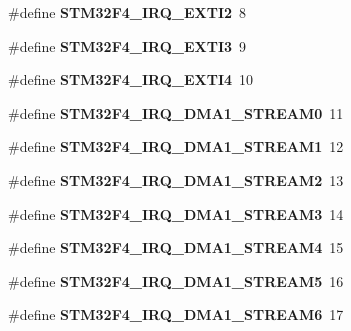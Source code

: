 \begin{DoxyCompactItemize}
\#define {\bfseries S\+T\+M32\+F4\+\_\+\+I\+R\+Q\+\_\+\+E\+X\+T\+I2}~8
\item 
\mbox{\label{group__stm32f4__interrupt_ga154966719a525ba32894b1c766f9f03e}} 
\#define {\bfseries S\+T\+M32\+F4\+\_\+\+I\+R\+Q\+\_\+\+E\+X\+T\+I3}~9
\item 
\mbox{\label{group__stm32f4__interrupt_gac0a4a7ef0818f678f265c4883b891dd8}} 
\#define {\bfseries S\+T\+M32\+F4\+\_\+\+I\+R\+Q\+\_\+\+E\+X\+T\+I4}~10
\item 
\mbox{\label{group__stm32f4__interrupt_ga84cbccdbb9016c1697e3b2ef7402d942}} 
\#define {\bfseries S\+T\+M32\+F4\+\_\+\+I\+R\+Q\+\_\+\+D\+M\+A1\+\_\+\+S\+T\+R\+E\+A\+M0}~11
\item 
\mbox{\label{group__stm32f4__interrupt_ga99718bf4e6b9f51a79b26a0c80fc21e6}} 
\#define {\bfseries S\+T\+M32\+F4\+\_\+\+I\+R\+Q\+\_\+\+D\+M\+A1\+\_\+\+S\+T\+R\+E\+A\+M1}~12
\item 
\mbox{\label{group__stm32f4__interrupt_gab0b705b79283390ec4a8bf6e19b87494}} 
\#define {\bfseries S\+T\+M32\+F4\+\_\+\+I\+R\+Q\+\_\+\+D\+M\+A1\+\_\+\+S\+T\+R\+E\+A\+M2}~13
\item 
\mbox{\label{group__stm32f4__interrupt_ga2c427c75c6db0481dcbc40a188bbc7ff}} 
\#define {\bfseries S\+T\+M32\+F4\+\_\+\+I\+R\+Q\+\_\+\+D\+M\+A1\+\_\+\+S\+T\+R\+E\+A\+M3}~14
\item 
\mbox{\label{group__stm32f4__interrupt_ga1ada2440341dca490794ce757d3bb8d7}} 
\#define {\bfseries S\+T\+M32\+F4\+\_\+\+I\+R\+Q\+\_\+\+D\+M\+A1\+\_\+\+S\+T\+R\+E\+A\+M4}~15
\item 
\mbox{\label{group__stm32f4__interrupt_gab6497ae6238c7fa37c16d885b278616e}} 
\#define {\bfseries S\+T\+M32\+F4\+\_\+\+I\+R\+Q\+\_\+\+D\+M\+A1\+\_\+\+S\+T\+R\+E\+A\+M5}~16
\item 
\mbox{\label{group__stm32f4__interrupt_gaa13fe3e0df827c7fcb860ca076bdbc5c}} 
\#define {\bfseries S\+T\+M32\+F4\+\_\+\+I\+R\+Q\+\_\+\+D\+M\+A1\+\_\+\+S\+T\+R\+E\+A\+M6}~17

\end{DoxyCompactItemize}

